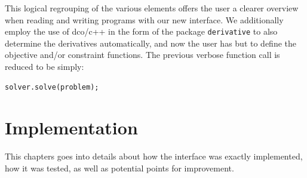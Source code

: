 \documentclass{book}
\begin{document}
\newline
This logical regrouping of the various elements offers the user a clearer overview when reading and writing programs with our new interface. We additionally employ the use of dco/c++ in the form of the package \texttt{derivative} to also determine the derivatives automatically, and now the user has but to define the objective and/or constraint functions. The previous verbose function call is reduced to be simply: 
\begin{lstlisting}[basicstyle=\normalsize]
solver.solve(problem);
\end{lstlisting}

\chapter{Implementation} \label{ch:implementation}
This chapters goes into details about how the interface was exactly implemented, how it was tested, as well as potential points for improvement.
\end{document}
